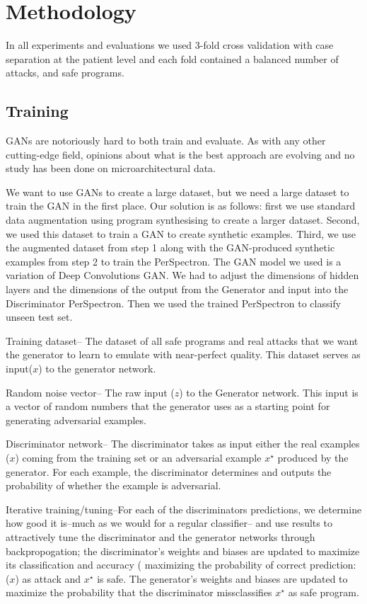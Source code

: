 \section{Methodology}\label{method}
In all experiments and evaluations we used 3-fold cross validation with case separation at
the patient level and each fold contained a balanced number
of attacks, and safe programs.



\subsection{Training}
GANs are notoriously hard to both train and evaluate. As with any other cutting-edge field, opinions about what is the best approach are evolving and no study has been done on microarchitectural data. 

We want to use GANs to create a large dataset, but we need a large dataset to train the GAN in the first place. 
Our solution is as follows:
first we use standard data augmentation using program synthesising to create a larger dataset. Second, we used this dataset to train a GAN to create synthetic examples. Third, we use the augmented dataset from step 1 along with the GAN-produced synthetic examples from step 2 to train the PerSpectron. The GAN model we used is a variation of Deep Convolutions GAN. We had to adjust the dimensions of hidden layers and the dimensions of the output from the Generator and input into the Discriminator PerSpectron. Then we used the trained PerSpectron to classify unseen test set.  

Training dataset-- The dataset of all safe programs and real attacks that we want the generator to learn to emulate with near-perfect quality. This dataset serves as input($x$) to the generator network. 

Random noise vector-- The raw input ($z$) to the Generator network. This input is a vector of random numbers that the generator uses as a starting point for generating adversarial examples. 

Discriminator network-- The discriminator takes as input either the real examples ($x$) coming from the training set or an adversarial example $x^{\star}$ produced by the generator. For each example, the discriminator determines and outputs the probability of whether the example is adversarial.

Iterative training/tuning--For each of the discriminators predictions, we determine how good it is--much as we would for a regular classifier-- and use results to attractively tune the discriminator and the generator networks through backpropogation; the discriminator's weights and biases are updated to maximize its classification and accuracy ( maximizing the probability of correct prediction: ($x$) as attack and $x^{\star}$ is safe. 
The generator's weights and biases are updated to maximize the probability that the discriminator missclassifies $x^{\star}$ as safe program. 



